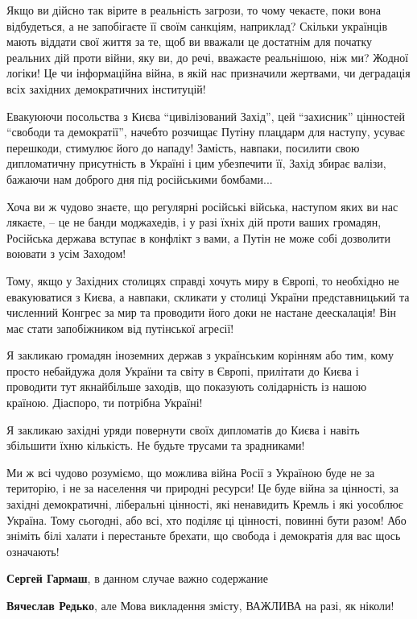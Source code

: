 \begin{itemize}
Якщо ви дійсно так вірите в реальність загрози, то чому чекаєте, поки вона
відбудеться, а не запобігаєте її своїм санкціям, наприклад? Скільки українців
мають віддати свої життя за те, щоб ви вважали це достатнім для початку
реальних дій проти війни, яку ви, до речі, вважаєте реальнішою, ніж ми? Жодної
логіки! Це чи інформаційна війна, в якій нас призначили жертвами, чи деградація
всіх західних демократичних інституцій!

Евакуюючи посольства з Києва \enquote{цивілізований Захід}, цей \enquote{захисник} цінностей
\enquote{свободи та демократії}, начебто розчищає Путіну плацдарм для наступу, усуває
перешкоди, стимулює його до нападу! Замість, навпаки, посилити свою
дипломатичну присутність в Україні і цим убезпечити її, Захід збирає валізи,
бажаючи нам доброго дня під російськими бомбами...

Хоча ви ж чудово знаєте, що регулярні російські війська, наступом яких ви нас
лякаєте, – це не банди моджахедів, і у разі їхніх дій проти ваших громадян,
Російська держава вступає в конфлікт з вами, а Путін не може собі дозволити
воювати з усім Заходом!

Тому, якщо у Західних столицях справді хочуть миру в Європі, то необхідно не
евакуюватися з Києва, а навпаки, скликати у столиці України представницький та
численний Конгрес за мир та проводити його доки не настане деескалація! Він має
стати запобіжником від путінської агресії!

Я закликаю громадян іноземних держав з українським корінням або тим, кому
просто небайдужа доля України та світу в Європі, прилітати до Києва і проводити
тут якнайбільше заходів, що показують солідарність із нашою країною. Діаспоро,
ти потрібна Україні!

Я закликаю західні уряди повернути своїх дипломатів до Києва і навіть збільшити
їхню кількість. Не будьте трусами та зрадниками!

Ми ж всі чудово розуміємо, що можлива війна Росії з Україною буде не за
територію, і не за населення чи природні ресурси! Це буде війна за цінності, за
західні демократичні, ліберальні цінності, які ненавидить Кремль і які уособлює
Україна. Тому сьогодні, або всі, хто поділяє ці цінності, повинні бути разом!
Або зніміть білі халати і перестаньте брехати, що свобода і демократія для вас
щось означають!

\begin{itemize} %
\textbf{Сергей Гармаш}, в данном случае важно содержание

\textbf{Вячеслав Редько}, але Мова викладення змісту, ВАЖЛИВА на разі, як ніколи!


\end{itemize}
\end{itemize}
